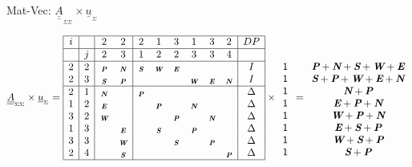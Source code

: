 \documentclass[handout]{beamer}
\newcommand{\Matriz}[1]{\underline{\underline{#1}}}
\newcommand{\Vector}[1]{\underline{#1}}
\newcommand{\SubScript}[1]{_{_{#1}}}
\newcommand{\mbi}[1]{\textbf{\em #1}}
\newcommand{\mbiu}[1]{_{\textbf{\em #1}}}
\begin{document}

\begin{frame}{Mat-Vec: $\Matriz{A}\SubScript{\Sigma \Sigma} \times \Vector{u}\SubScript{\Sigma}$}

\begin{tiny}
\begin{equation*}
\Matriz{A}\SubScript{\Sigma \Sigma} \times \Vector{u}\SubScript{\Sigma}= 
\begin{array}{|c|c|cc|cccccc|c|}
\hline
i  &   & 2 & 2 & 2 & 1 & 3 & 1 & 3 & 2 & DP\\
\hline
   & j & 2 & 3 & 1 & 2 & 2 & 3 & 3 & 4 & \\
\hline
2 & 2 & \mbiu{P} & \mbiu{N} & \mbiu{S} & \mbiu{W} & \mbiu{E} &  &  &  & I \\
2 & 3 & \mbiu{S} & \mbiu{P} &  &  &  & \mbiu{W} & \mbiu{E} & \mbiu{N} & I \\
\hline
2 & 1 & \mbiu{N} &  & \mbiu{P} &  &          &  &  &  & \Delta \\
1 & 2 & \mbiu{E} &  &  & \mbiu{P} &  & \mbiu{N} &  &  & \Delta \\
3 & 2 & \mbiu{W} &  &  &  & \mbiu{P} &  & \mbiu{N} &  & \Delta \\
1 & 3 &  & \mbiu{E} &  & \mbiu{S} &  & \mbiu{P} &  &  & \Delta \\
3 & 3 &  & \mbiu{W} &  &  & \mbiu{S} &  & \mbiu{P} &  & \Delta  \\
2 & 4 &  & \mbiu{S} &  &  &          &  &  & \mbiu{P} & \Delta  \\
\hline
\end{array} \times
\begin{array}{c}
\\
\\
\mathsf{1} \\
\mathsf{1} \\
\mathsf{1} \\
\mathsf{1} \\
\mathsf{1} \\
\mathsf{1} \\
\mathsf{1} \\
\mathsf{1} \\
\end{array} =
\begin{array}{c}
\\
\\
\mbi{P} + \mbi{N} + \mbi{S} + \mbi{W} + \mbi{E}\\
\mbi{S} + \mbi{P} + \mbi{W} + \mbi{E} + \mbi{N}\\
\mbi{N} + \mbi{P}\\
\mbi{E} + \mbi{P} + \mbi{N}\\
\mbi{W} + \mbi{P} + \mbi{N} \\
\mbi{E} + \mbi{S} + \mbi{P}\\
\mbi{W} + \mbi{S} + \mbi{P}\\
\mbi{S} + \mbi{P}\\
\end{array}
\end{equation*}
\end{tiny}


\end{frame}
\end{document}
